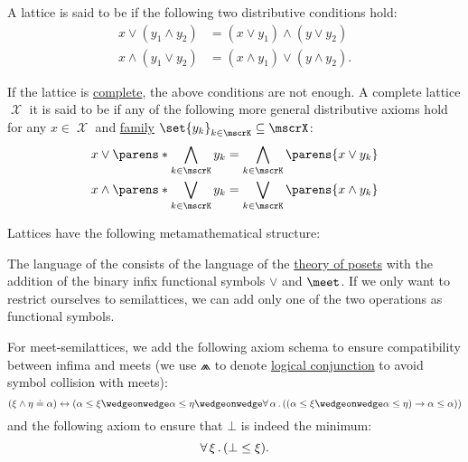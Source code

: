 \begin{definition}
\begin{thmenum}[series=def:semilattice]
     A lattice is said to be  if the following two distributive conditions hold:
    \begin{align}
      x \vee (y_1 \wedge y_2) &= (x \vee y_1) \wedge (y \vee y_2) \label{eq:def:semilattice/distributive_lattice/finite/meet_of_joins} \\
      x \wedge (y_1 \vee y_2) &= (x \wedge y_1) \vee (y \wedge y_2) \label{eq:def:semilattice/distributive_lattice/finite/join_of_meets}.
    \end{align}

    If the lattice is \hyperref[def:semilattice/complete]{complete}, the above conditions are not enough. A complete lattice \( \mscrX \) it is said to be  if any of the following more general distributive axioms hold for any \( x \in \mscrX \) and \hyperref[def:indexed_family]{family} \( \set{ y_k }_{k \in \mscrK} \subseteq \mscrX \):
    \begin{align}
      x \vee \parens*{ \bigwedge_{k \in \mscrK} y_k } &= \bigwedge_{k \in \mscrK} \parens{ x \vee y_k } \label{eq:def:semilattice/distributive_lattice/arbitrary/meet_of_joins} \\
      x \wedge \parens*{ \bigvee_{k \in \mscrK} y_k } &= \bigvee_{k \in \mscrK} \parens{ x \wedge y_k } \label{eq:def:semilattice/distributive_lattice/arbitrary/join_of_meets}
    \end{align}
  \end{thmenum}

  Lattices have the following metamathematical structure:
  \begin{thmenum}[resume=def:semilattice]
     The language of the  consists of the language of the \hyperref[def:poset/theory]{theory of posets} with the addition of the binary infix functional symbols \( \vee \) and \( \meet \). If we only want to restrict ourselves to semilattices, we can add only one of the two operations as functional symbols.

    For meet-semilattices, we add the following axiom schema to ensure compatibility between infima and meets (we use \( \wedgeonwedge \) to denote \hyperref[def:propositional_language/connectives/conjunction]{logical conjunction} to avoid symbol collision with meets):
    \begin{equation}\label{eq:def:semilattice/theory/meet_compat}
      (\xi \wedge \eta \doteq \alpha) \leftrightarrow (\alpha \leq \xi \wedgeonwedge \alpha \leq \eta \wedgeonwedge \qforall \alpha ((\alpha \leq \xi \wedgeonwedge \alpha \leq \eta) \rightarrow \alpha \leq \alpha))
    \end{equation}
    and the following axiom to ensure that \( \bot \) is indeed the minimum:
    \begin{equation}\label{eq:def:semilattice/theory/bottom_compat}
      \forall \thinspace \xi \thinspace . \thinspace (\bot \leq \xi).
    \end{equation}


\end{thmenum}
\end{definition}
